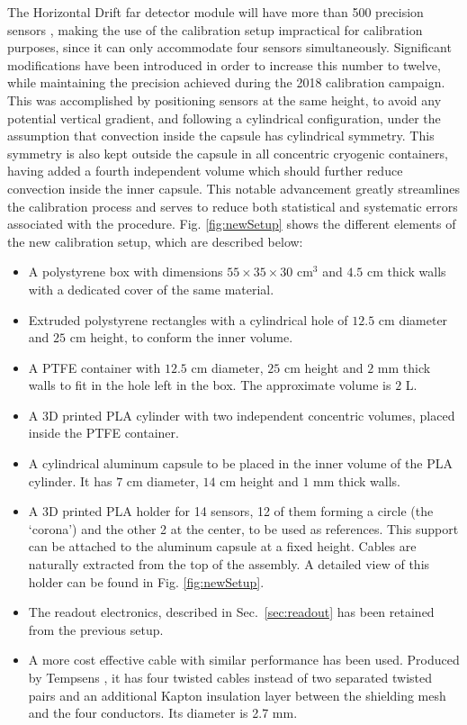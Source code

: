 \noindent The Horizontal Drift far detector module will have more than 500 precision sensors \cite{dune_tdr4}, making the use of the calibration setup impractical for calibration purposes, since it can only accommodate four sensors simultaneously. Significant modifications have been introduced in order to increase this number to twelve, while maintaining the precision achieved during the 2018 calibration campaign. This was accomplished by positioning sensors at the same height, to avoid any potential vertical gradient, and following a cylindrical configuration, under the assumption that convection inside the capsule has cylindrical symmetry.
This symmetry is also kept outside the capsule in all concentric cryogenic containers, having added a fourth independent volume which should further reduce convection inside the inner capsule.
This notable advancement greatly streamlines the calibration process and serves to reduce both statistical and systematic errors associated with the procedure. Fig. \ref{fig:newSetup} shows the different elements of the new calibration setup, which are described below:

\begin{itemize}
    \item A polystyrene box with dimensions $55\times35\times30$ cm$^{3}$ and $4.5$ cm thick walls with a dedicated cover of the same material.
    \item Extruded polystyrene rectangles with a cylindrical hole of $12.5$ cm diameter and $25$ cm height, to conform the inner volume.
    \item A PTFE container with $12.5$ cm diameter, $25$ cm height and $2$ mm thick walls to fit in the hole left in the box. The approximate volume is $2$ L.
    \item A 3D printed PLA cylinder with two independent concentric volumes, placed inside the PTFE container.
    \item A cylindrical aluminum capsule to be placed in the inner volume of the PLA cylinder. It has $7$ cm diameter,  $14$ cm height and $1$ mm thick walls.
    \item A 3D printed PLA holder for 14 sensors, 12 of them forming a circle (the `corona') and the other 2 at the center, to be used as references. This support can be attached to the aluminum capsule at a fixed height. Cables are naturally extracted from the top of the assembly. A detailed view of this holder can be found in Fig. \ref{fig:newSetup}.
    \item The readout electronics, described in Sec.~\ref{sec:readout} has been retained from the previous setup.
    \item A more cost effective cable with similar performance has been used. Produced by Tempsens \cite{tempsens}, it has four twisted cables instead of two separated twisted pairs and an additional Kapton insulation layer between the shielding mesh and the four conductors. Its diameter is 2.7 mm.
\end{itemize}

